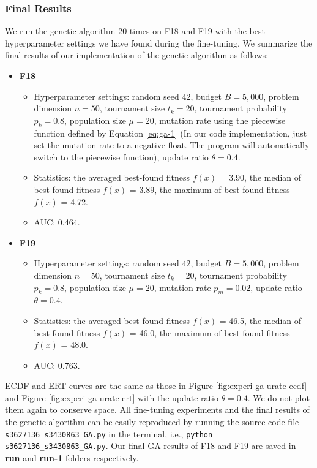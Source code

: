 \documentclass{article}
\begin{document}
\subsubsection{Final Results}
We run the genetic algorithm 20 times on F18 and F19 with the best hyperparameter settings we have found during the fine-tuning. We summarize the final results of our implementation of the genetic algorithm as follows:

\begin{itemize}
    \item \textbf{F18}
        \begin{itemize}
            \item Hyperparameter settings: random seed $42$, budget $B = 5,000$, problem dimension $n = 50$, tournament size $t_k = 20$, tournament probability $p_k = 0.8$, population size $\mu = 20$, mutation rate using the piecewise function defined by Equation \ref{eq:ga-1} (In our code implementation, just set the mutation rate to a negative float. The program will automatically switch to the piecewise function), update ratio $\theta = 0.4$.
            \item Statistics: the averaged best-found fitness $f(x)$ = 3.90, the median of best-found fitness $f(x)$ = 3.89, the maximum of best-found fitness $f(x)$ = 4.72.
            \item AUC: 0.464.
        \end{itemize}
    \item \textbf{F19}
        \begin{itemize}
            \item Hyperparameter settings: random seed $42$, budget $B = 5,000$, problem dimension $n = 50$, tournament size $t_k = 20$, tournament probability $p_k = 0.8$, population size $\mu = 20$, mutation rate $p_m = 0.02$, update ratio $\theta = 0.4$.
            \item Statistics: the averaged best-found fitness $f(x)$ = 46.5, the median of best-found fitness $f(x)$ = 46.0, the maximum of best-found fitness $f(x)$ = 48.0.
            \item AUC: 0.763.
        \end{itemize}
\end{itemize}

ECDF and ERT curves are the same as those in Figure \ref{fig:experi-ga-urate-ecdf} and Figure \ref{fig:experi-ga-urate-ert} with the update ratio $\theta = 0.4$. We do not plot them again to conserve space. All fine-tuning experiments and the final results of the genetic algorithm can be easily reproduced by running the source code file \texttt{s3627136\_s3430863\_GA.py} in the terminal, i.e., \texttt{python s3627136\_s3430863\_GA.py}. Our final GA results of F18 and F19 are saved in \textbf{run} and \textbf{run-1} folders respectively.
\end{document}
